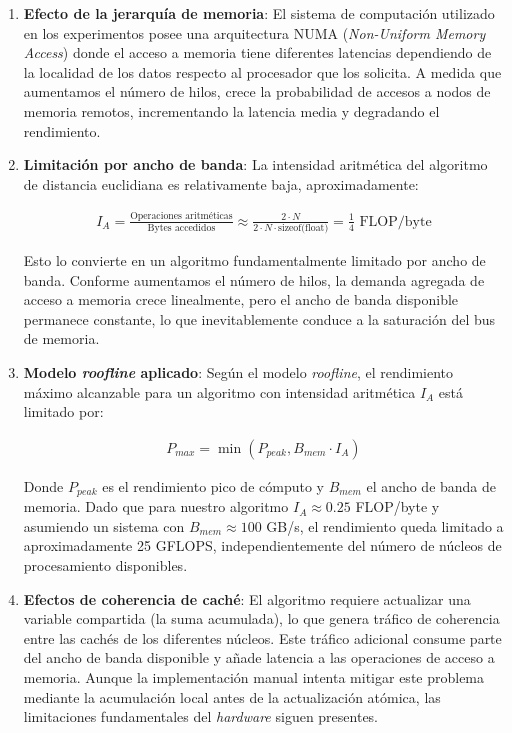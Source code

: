         \begin{enumerate}

            \item \textbf{Efecto de la jerarquía de memoria}: El sistema de computación utilizado en los experimentos posee una arquitectura NUMA (\textit{Non-Uniform Memory Access}) donde el acceso a memoria tiene diferentes latencias dependiendo de la localidad de los datos respecto al procesador que los solicita. A medida que aumentamos el número de hilos, crece la probabilidad de accesos a nodos de memoria remotos, incrementando la latencia media y degradando el rendimiento.
            
            \item \textbf{Limitación por ancho de banda}: La intensidad aritmética del algoritmo de distancia euclidiana es relativamente baja, aproximadamente:

            \begin{align}
                I_A = \frac{\text{Operaciones aritméticas}}{\text{Bytes accedidos}} \approx \frac{2 \cdot N}{2 \cdot N \cdot \text{sizeof(float)}} = \frac{1}{4} \text{ FLOP/byte} 
            \end{align}
            
            Esto lo convierte en un algoritmo fundamentalmente limitado por ancho de banda. Conforme aumentamos el número de hilos, la demanda agregada de acceso a memoria crece linealmente, pero el ancho de banda disponible permanece constante, lo que inevitablemente conduce a la saturación del bus de memoria.
            
            \item \textbf{Modelo \textit{roofline} aplicado}: Según el modelo \textit{roofline}, el rendimiento máximo alcanzable para un algoritmo con intensidad aritmética $I_A$ está limitado por:

            \begin{align}
                P_{max} = \min(P_{peak}, B_{mem} \cdot I_A)
            \end{align}
            
            Donde $P_{peak}$ es el rendimiento pico de cómputo y $B_{mem}$ el ancho de banda de memoria. Dado que para nuestro algoritmo $I_A \approx 0.25$ FLOP/byte y asumiendo un sistema con $B_{mem} \approx 100$ GB/s, el rendimiento queda limitado a aproximadamente 25 GFLOPS, independientemente del número de núcleos de procesamiento disponibles.
            
            \item \textbf{Efectos de coherencia de caché}: El algoritmo requiere actualizar una variable compartida (la suma acumulada), lo que genera tráfico de coherencia entre las cachés de los diferentes núcleos. Este tráfico adicional consume parte del ancho de banda disponible y añade latencia a las operaciones de acceso a memoria. Aunque la implementación manual intenta mitigar este problema mediante la acumulación local antes de la actualización atómica, las limitaciones fundamentales del \textit{hardware} siguen presentes.

        \end{enumerate}

